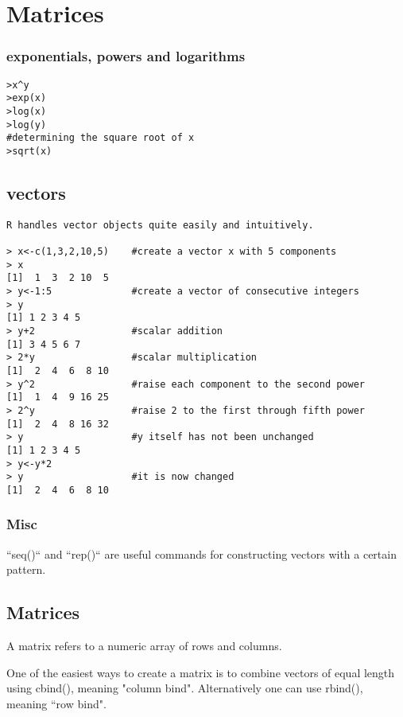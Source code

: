 \section{Matrices}

%


\subsubsection{exponentials, powers and logarithms}
\begin{framed}
\begin{verbatim}
>x^y
>exp(x)
>log(x)
>log(y)
#determining the square root of x
>sqrt(x)
\end{verbatim}
\end{framed}

\subsection{vectors}
\begin{framed}
\begin{verbatim}
R handles vector objects quite easily and intuitively.

> x<-c(1,3,2,10,5)    #create a vector x with 5 components
> x
[1]  1  3  2 10  5
> y<-1:5              #create a vector of consecutive integers
> y
[1] 1 2 3 4 5
> y+2                 #scalar addition
[1] 3 4 5 6 7
> 2*y                 #scalar multiplication
[1]  2  4  6  8 10
> y^2                 #raise each component to the second power
[1]  1  4  9 16 25
> 2^y                 #raise 2 to the first through fifth power
[1]  2  4  8 16 32
> y                   #y itself has not been unchanged
[1] 1 2 3 4 5
> y<-y*2
> y                   #it is now changed
[1]  2  4  6  8 10
\end{verbatim}
\end{framed}

\subsubsection{Misc}
``seq()`` and ``rep()`` are useful commands for constructing vectors with a certain pattern.

%

\subsection{Matrices}
A matrix refers to a numeric array of rows and columns.

One of the easiest ways to create a matrix is to combine vectors of equal
length using cbind(), meaning "column bind". Alternatively one can use rbind(), meaning ``row bind".


